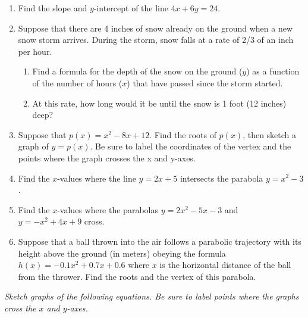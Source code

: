 \documentclass[11pt]{article}
\begin{document}
\begin{enumerate}
\setcounter{enumi}{\theenumCount}
\item Find the slope and $y$-intercept of the line $4x + 6y = 24$.
\vfill


\item Suppose that there are 4 inches of snow already on the ground when a new snow storm arrives.  During the storm, snow falls at a rate of 2/3 of an inch per hour.  
\begin{enumerate}
\item Find a formula for the depth of the snow on the ground ($y$) as a function of the number of hours ($x$) that have passed since the storm started. 
\vfill

\item At this rate, how long would it be until the snow is 1 foot (12 inches) deep?  
\vfill
\end{enumerate}

\item Suppose that $p(x) = x^2 - 8x + 12$. Find the roots of $p(x)$, then sketch a graph of $y = p(x)$.  Be sure to label the coordinates of the vertex and the points where the graph crosses the x and y-axes. 
\vfill

\item Find the $x$-values where the line $y = 2x + 5$ intersects the parabola $y=x^2 - 3$. 
\vfill


\newpage

\item Find the $x$-values where the parabolas $y = 2x^2 - 5x - 3$ and $y = -x^2 + 4x + 9$ cross. 
\vfill

\item Suppose that a ball thrown into the air follows a parabolic trajectory with its height above the ground (in meters) obeying the formula $h(x) = -0.1x^2 + 0.7x + 0.6$ where $x$ is the horizontal distance of the ball from the thrower.  Find the roots and the vertex of this parabola.  
\vfill


\setcounter{enumCount}{\theenumi}
\end{enumerate}

\noindent
\textit{Sketch graphs of the following equations.  Be sure to label points where the graphs cross the $x$ and $y$-axes.}
\end{document}
